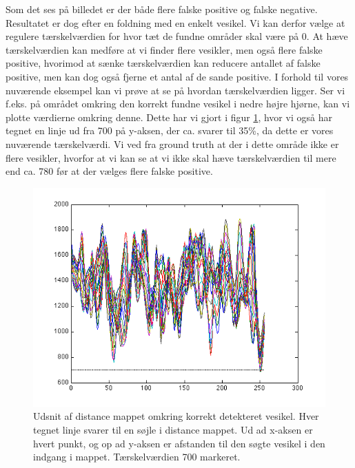 Som det ses på billedet er der både flere falske positive og falske negative. Resultatet er dog efter en foldning med en enkelt vesikel. Vi kan derfor vælge at regulere tærskelværdien for hvor tæt de fundne områder skal være på 0. At hæve tærskelværdien kan medføre at vi finder flere vesikler, men også flere falske positive, hvorimod at sænke tærskelværdien kan reducere antallet af falske positive, men kan dog også fjerne et antal af de sande positive. I forhold til vores nuværende eksempel kan vi prøve at se på hvordan tærskelværdien ligger. Ser vi f.eks. på området omkring den korrekt fundne vesikel i nedre højre hjørne, kan vi plotte værdierne omkring denne. Dette har vi gjort i figur \ref{fig:postmethod_conv_lines_1}, hvor vi også har tegnet en linje ud fra 700 på y-aksen, der ca. svarer til 35\%, da dette er vores nuværende tærskelværdi. Vi ved fra ground truth at der i dette område ikke er flere vesikler, hvorfor at vi kan se at vi ikke skal hæve tærskelværdien til mere end ca. 780 før at der vælges flere falske positive. 

\begin{figure}[H]
		\centering
		\includegraphics[scale=0.9]{files/postmethod/img/conv_lines_1.png}
	\caption{Udsnit af distance mappet omkring korrekt detekteret vesikel. Hver tegnet linje svarer til en søjle i distance mappet. Ud ad x-aksen er hvert punkt, og op ad y-aksen er afstanden til den søgte vesikel i den indgang i mappet. Tærskelværdien 700 markeret.\label{fig:postmethod_conv_lines_1}}
\end{figure}

